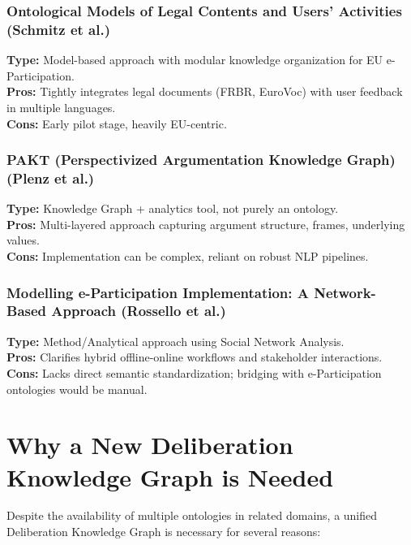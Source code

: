 \documentclass[11pt,a4paper]{article}
\begin{document}
\subsubsection{Ontological Models of Legal Contents and Users’ Activities (Schmitz et al.) \cite{Schmitz2017}}
\textbf{Type:} Model-based approach with modular knowledge organization for EU e-Participation.\\
\textbf{Pros:} Tightly integrates legal documents (FRBR, EuroVoc) with user feedback in multiple languages.\\
\textbf{Cons:} Early pilot stage, heavily EU-centric.

\subsubsection{PAKT (Perspectivized Argumentation Knowledge Graph) (Plenz et al.) \cite{Plenz2024}}
\textbf{Type:} Knowledge Graph + analytics tool, not purely an ontology.\\
\textbf{Pros:} Multi-layered approach capturing argument structure, frames, underlying values.\\
\textbf{Cons:} Implementation can be complex, reliant on robust NLP pipelines.

\subsubsection{Modelling e-Participation Implementation: A Network-Based Approach (Rossello et al.) \cite{Rossello2023}}
\textbf{Type:} Method/Analytical approach using Social Network Analysis.\\
\textbf{Pros:} Clarifies hybrid offline-online workflows and stakeholder interactions.\\
\textbf{Cons:} Lacks direct semantic standardization; bridging with e-Participation ontologies would be manual.




\section{Why a New Deliberation Knowledge Graph is Needed}

Despite the availability of multiple ontologies in related domains, a unified Deliberation Knowledge Graph is necessary for several reasons:
\end{document}
